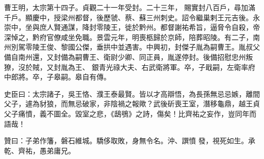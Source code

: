 \begin{pinyinscope}
 曹王明，太宗第十四子。貞觀二十一年受封。二十三年，
 賜實封八百戶，尋加滿千戶。顯慶中，授梁州都督，後歷虢、蔡、蘇三州刺史。詔令繼巢剌王元吉後。永崇中，坐與庶人賢通謀，降封零陵王，徙於黔州。都督謝祐希旨，逼脅令自殺，帝深悼之，黔府官僚咸坐免職。景雲元年，明喪柩歸於京師，陪葬昭陵。有二子，南州別駕零陵王俊、黎國公傑，垂拱中並遇害。中興初，封傑子胤為嗣曹王。胤叔父備自南州還，又封備為嗣曹王、衛尉少卿、同正員，胤遂停封。後備招慰忠州叛獠，沒於賊，又封胤為王、
 銀青光祿大夫、右武衛將軍。卒，子戢嗣，左衛率府中郎將。卒，子皋嗣。皋自有傳。



 史臣曰：太宗諸子，吳王恪、濮王泰最賢。皆以才高辯悟，為長孫無忌忌嫉，離間父子，遽為豺狼，而無忌破家，非陰禍之報歟？武後斫喪王室，潛移龜鼎，越王貞父子痛憤，義不圖全。毀室之悲，《鴟鴞》之詩，傷矣！比齊祐之妄作，豈同年而語哉！



 贊曰：子弟作籓，磐石維城。驕侈取敗，身無令名。沖、譔憤
 發，視死如生。承乾、齊祐，愚弟庸兄。



\end{pinyinscope}